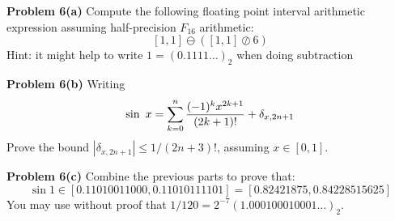 \documentclass[12pt,a4paper]{article}
\begin{document}
\textbf{Problem 6(a)} Compute the following floating point interval arithmetic expression assuming half-precision $F_{16}$ arithmetic:
\[
[1,1] \ensuremath{\ominus} ([1,1] \ensuremath{\oslash} 6)
\]
Hint: it might help to write $1 = (0.1111\ensuremath{\ldots})_2$ when doing subtraction

\textbf{Problem 6(b)} Writing 
\[
\sin\ x = \ensuremath{\sum}_{k=0}^n {(-1)^k x^{2k+1} \over (2k+1)!} + \ensuremath{\delta}_{x,2n+1}
\]
Prove the bound $|\ensuremath{\delta}_{x,2n+1}| \ensuremath{\leq} 1/(2n+3)!$, assuming $x \ensuremath{\in} [0,1]$.

\textbf{Problem 6(c)} Combine the previous parts to prove that:
\[
\sin 1 \ensuremath{\in} [0.11010011000, 0.11010111101] = [0.82421875, 0.84228515625]
\]
You may use without proof that $1/120 = 2^{-7} (1.000100010001\ensuremath{\ldots})_2$. 
\end{document}
